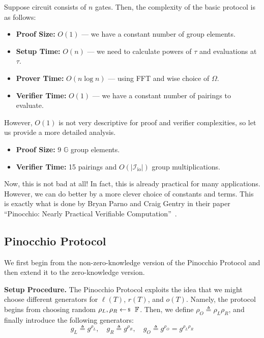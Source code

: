 \documentclass[../../book.tex]{subfiles}
\begin{document}
\begin{proposition}
    Suppose circuit consists of $n$ gates. Then, the complexity of the basic protocol is as follows:
    \begin{itemize}
        \item \textbf{Proof Size:} $O(1)$ --- we have a constant number of group elements.
        \item \textbf{Setup Time:} $O(n)$ --- we need to calculate powers of $\tau$ and evaluations at $\tau$.
        \item \textbf{Prover Time:} $O(n \log n)$ --- using FFT and wise choice of $\Omega$.
        \item \textbf{Verifier Time:} $O(1)$ --- we have a constant number of pairings to evaluate.
    \end{itemize}

    However, $O(1)$ is not very descriptive for proof and verifier complexities, so let us provide a more detailed analysis. 
    \begin{itemize}
        \item \textbf{Proof Size:} 9 $\mathbb{G}$ group elements.
        \item \textbf{Verifier Time:} 15 pairings and $O(|\mathcal{I}_{\text{io}}|)$ group multiplications.
    \end{itemize}
\end{proposition}

Now, this is not bad at all! In fact, this is already practical for many applications. However, we can do better by a more clever choice of constants and terms. This is exactly what is done by Bryan Parno and Craig Gentry in their paper ``Pinocchio: Nearly Practical Verifiable Computation''~\cite{pinocchio}.

\subsection{Pinocchio Protocol}

We first begin from the non-zero-knowledge version of the Pinocchio Protocol and then extend it to the zero-knowledge version.

\textcolor{blue!75!gray}{\textbf{Setup Procedure.}} The Pinocchio Protocol exploits the idea that we might 
choose different generators for $\ell(T)$, $r(T)$, and $o(T)$. 
Namely, the protocol begins from choosing random $\rho_L,\rho_R \leftarrowS \mathbb{F}$. 
Then, we define $\rho_O \triangleq \rho_L\rho_R$, and finally introduce the following generators:
\begin{equation*}
    g_L \triangleq g^{\rho_L}, \quad g_R \triangleq g^{\rho_R}, \quad g_O \triangleq g^{\rho_O} = g^{\rho_L\rho_R}
\end{equation*}
\end{document}
